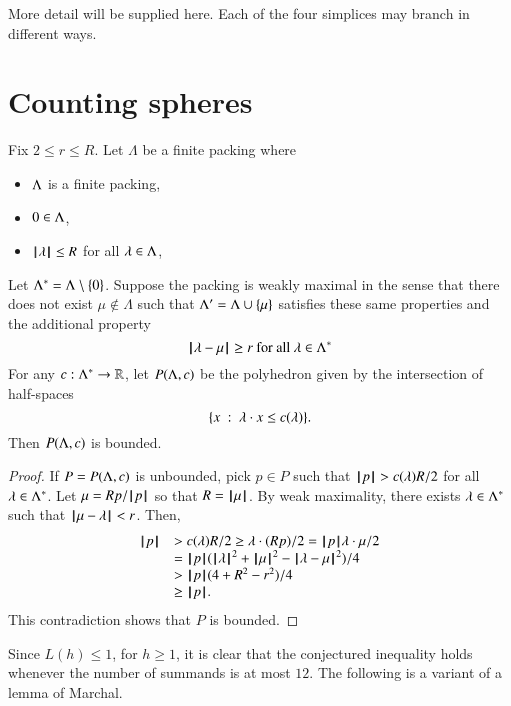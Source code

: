 \begin{note}%
More detail will be supplied here.  Each of the four simplices may branch in different ways.
\end{note}

\section{Counting spheres}

\begin{lemma}\label{lemma:poly-bounded} 
Fix $2\le r\le R$.
Let $\Lambda$ be a finite packing where 
\begin{itemize}
  \item $\Lambda$ is a finite packing, 
  \item $0\in\Lambda$,
  \item ${{\hskip0.1em|\hskip-0.15em|\hskip0.1em}\lambda{\hskip0.1em|\hskip-0.15em|\hskip0.1em}}\le R$ for all $\lambda\in\Lambda$,
\end{itemize}
Let $\Lambda^*=\Lambda\setminus\{0\}$.
Suppose the packing is weakly maximal in the sense that there does not exist $\mu\not\in\Lambda$ such that $\Lambda'=\Lambda\cup\{\mu\}$ satisfies these same properties
and the additional property
 $$
{\hskip0.1em|\hskip-0.15em|\hskip0.1em}\lambda - \mu{\hskip0.1em|\hskip-0.15em|\hskip0.1em}\ge r \text{ for all } \lambda\in\Lambda^*
 $$
For any $c:\Lambda^*\to\mathbb{R}$, let $P(\Lambda,c)$ be the
polyhedron given by the intersection of half-spaces
$$
\{x \ :\  \lambda\cdot x \le c(\lambda)\}.
$$
Then $P(\Lambda,c)$ is bounded.
\end{lemma}

\begin{proof}  If $P=P(\Lambda,c)$ is unbounded, pick $p\in P$ such that
${{\hskip0.1em|\hskip-0.15em|\hskip0.1em}p{\hskip0.1em|\hskip-0.15em|\hskip0.1em}} > c(\lambda) R/2$ for all $\lambda\in\Lambda^*$.  Let $\mu =  R p/{{\hskip0.1em|\hskip-0.15em|\hskip0.1em}p{\hskip0.1em|\hskip-0.15em|\hskip0.1em}}$ so that $R={{\hskip0.1em|\hskip-0.15em|\hskip0.1em}\mu{\hskip0.1em|\hskip-0.15em|\hskip0.1em}}$.  By weak maximality, there exists $\lambda\in\Lambda^*$ such that ${\hskip0.1em|\hskip-0.15em|\hskip0.1em}\mu - \lambda{\hskip0.1em|\hskip-0.15em|\hskip0.1em}<r$.    Then,
$$
\begin{array}{lll}
\normo{p} &> c(\lam) R/2 \ge \lam\cdot (R p)/2 = \normo{p} \lam\cdot \mu /2\\
  &= \normo{p} (\normo{\lam}^2 + \normo{\mu}^2 - \norm{\lam}{\mu}^2)/4\\
  &> \normo{p}(4+R^2-r^2)/4\\
  &\ge \normo{p}.
\end{array}
$$
This contradiction shows that $P$ is bounded.
\end{proof}




Since $L(h)\le 1$, for $h\ge1$, it is clear that the conjectured inequality holds whenever the number of summands is at most $12$. The following is a variant of a lemma of Marchal.


